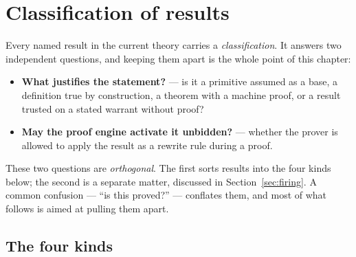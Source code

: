 \chapter{Classification of results}
\label{ch:classification}

Every named result in the current theory carries a \emph{classification}.
It answers two independent questions, and keeping them apart is the whole
point of this chapter:

\begin{itemize}
\item \textbf{What justifies the statement?} --- is it a primitive
  assumed as a base, a definition true by construction, a theorem with a
  machine proof, or a result trusted on a stated warrant without proof?
\item \textbf{May the proof engine activate it unbidden?} --- whether the
  prover is allowed to apply the result as a rewrite rule during a proof.
\end{itemize}

\noindent
These two questions are \emph{orthogonal}.  The first sorts results into
the four kinds below; the second is a separate matter, discussed in
Section~\ref{sec:firing}.  A common confusion --- ``is this proved?'' ---
conflates them, and most of what follows is aimed at pulling them apart.

\section{The four kinds}
\label{sec:four-kinds}

